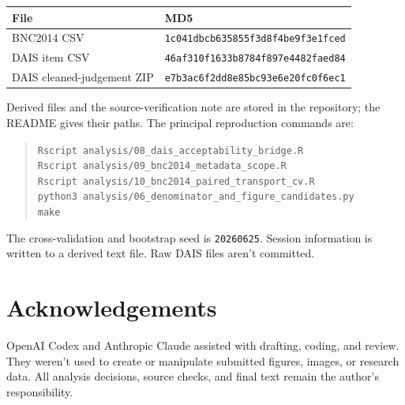 \documentclass[12pt]{article}
\begin{document}
\begin{center}
\small
\begin{tabular}{ll}
\toprule
File & MD5 \\
\midrule
BNC2014 CSV & \texttt{1c041dbcb635855f3d8f4be9f3e1fced} \\
DAIS item CSV & \texttt{46af310f1633b8784f897e4482faed84} \\
DAIS cleaned-judgement ZIP & \texttt{e7b3ac6f2dd8e85bc93e6e20fc0f6ec1} \\
\bottomrule
\end{tabular}
\end{center}

Derived files and the source-verification note are stored in the repository;
the README gives their paths. The principal reproduction commands are:

\begin{quote}
\small
\texttt{Rscript analysis/08\_dais\_acceptability\_bridge.R}\\
\texttt{Rscript analysis/09\_bnc2014\_metadata\_scope.R}\\
\texttt{Rscript analysis/10\_bnc2014\_paired\_transport\_cv.R}\\
\texttt{python3 analysis/06\_denominator\_and\_figure\_candidates.py}\\
\texttt{make}
\end{quote}

The cross-validation and bootstrap seed is \texttt{20260625}. Session
information is written to a derived text file. Raw DAIS files aren't committed.

\section*{Acknowledgements}

OpenAI Codex and Anthropic Claude assisted with drafting, coding, and review.
They weren't used to create or manipulate submitted figures, images, or
research data. All analysis decisions, source checks, and final text remain the
author's responsibility.

\clearpage
\printbibliography

\clearpage

\end{document}
